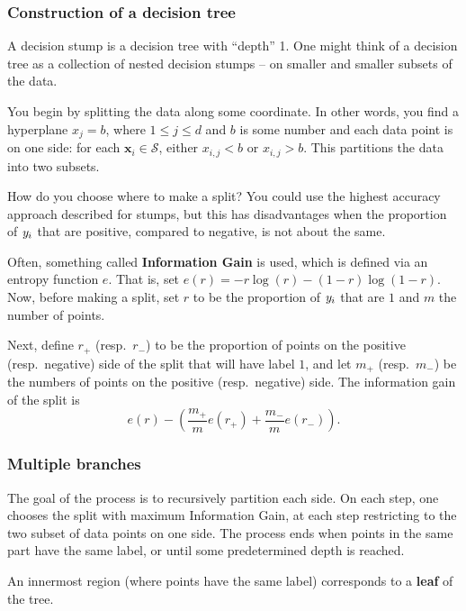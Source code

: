 \documentclass[smaller]{beamer}
\theoremstyle{example}
\newcommand{\x}{\textbf{x}}
\newcommand{\ix}[1]{{\it #1}}
\begin{document}
\begin{frame}
    \frametitle{Construction of a decision tree}
A decision stump is a decision tree with ``depth'' 1. One might think of a decision tree as a collection of nested decision stumps -- on smaller and smaller subsets of the data.

You begin by splitting the data along some coordinate. In other words, you find a hyperplane $ x_j = b$, where $ 1\le j\le d$ and $b$ is some number and each data point is on one side: for each $\x_i \in \mathcal S$, either $x_{i,j} < b$ or $ x_{i,j} > b$. This partitions the data into two subsets.

How do you choose where to make a split? You could use the highest accuracy approach described for stumps, but this has disadvantages when the proportion of $\ix y_i$ that are positive, compared to negative, is not about the same.

Often, something called \textbf{Information Gain} is used, which is defined via an entropy function $e$. That is, set $e(r) = -r\log(r) - (1-r)\log(1-r)$. Now, before making a split, set $r$ to be the proportion of $\ix y_i$ that are $1$ and $m$ the number of points. 

Next, define $r_+$ (resp.\ $r_-$) to be the proportion of points on the positive (resp.\ negative) side of the split that will have label $1$, and let $m_+$ (resp.\ $m_-$) be the numbers of points on the positive (resp.\ negative) side. The information gain of the split is 
    \[e(r) - (\frac{m_+}{m}e(r_+) + \frac{m_-}{m}e(r_-)).\]

\end{frame}


\begin{frame}
    \frametitle{Multiple branches}
The goal of the process is to recursively partition each side. On each step, one chooses the split with maximum Information Gain, at each step restricting to the two subset of data points on one side. The process ends when points in the same part have the same label, or until some predetermined depth is reached. 

An innermost region (where points have the same label) corresponds to a \textbf{leaf} of the tree.
\end{frame}
\end{document}
